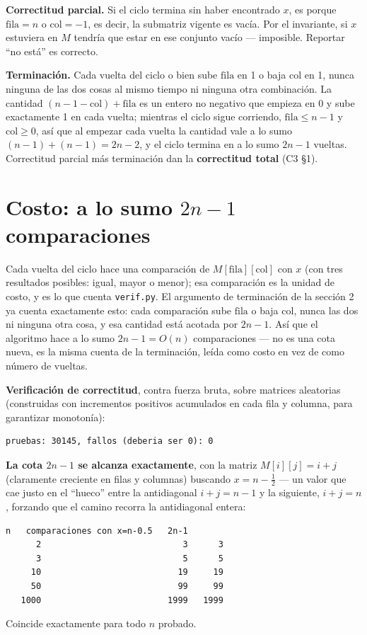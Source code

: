 \documentclass[11pt]{article}
\begin{document}
\textbf{Correctitud parcial.} Si el ciclo termina sin haber encontrado $x$, es porque
$\mathrm{fila}=n$ o $\mathrm{col}=-1$, es decir, la submatriz vigente es vacía. Por el invariante, si $x$
estuviera en $M$ tendría que estar en ese conjunto vacío --- imposible. Reportar ``no está'' es correcto.

\textbf{Terminación.} Cada vuelta del ciclo o bien sube $\mathrm{fila}$ en 1 o baja $\mathrm{col}$ en 1,
nunca ninguna de las dos cosas al mismo tiempo ni ninguna otra combinación. La cantidad
$(n-1-\mathrm{col})+\mathrm{fila}$ es un entero no negativo que empieza en 0 y sube exactamente 1 en cada
vuelta; mientras el ciclo sigue corriendo, $\mathrm{fila}\le n-1$ y $\mathrm{col}\ge 0$, así que al empezar
cada vuelta la cantidad vale a lo sumo $(n-1)+(n-1)=2n-2$, y el ciclo termina en a lo sumo $2n-1$ vueltas. Correctitud parcial más terminación dan la
\textbf{correctitud total} (C3 §1).

\section{Costo: a lo sumo \texorpdfstring{$2n-1$}{2n-1} comparaciones}

Cada vuelta del ciclo hace una comparación de $M[\mathrm{fila}][\mathrm{col}]$ con $x$ (con tres
resultados posibles: igual, mayor o menor); esa comparación es la unidad de costo, y es lo que cuenta
\texttt{verif.py}. El argumento de terminación de la sección 2 ya cuenta exactamente esto: cada comparación sube
$\mathrm{fila}$ o baja $\mathrm{col}$, nunca las dos ni ninguna otra cosa, y esa cantidad está acotada por
$2n-1$. Así que el algoritmo hace a lo sumo $2n-1=O(n)$ comparaciones --- no es una cota nueva, es la misma
cuenta de la terminación, leída como costo en vez de como número de vueltas.

\textbf{Verificación de correctitud}, contra fuerza bruta, sobre matrices aleatorias (construidas con
incrementos positivos acumulados en cada fila y columna, para garantizar monotonía):
\begin{lstlisting}[style=salida]
pruebas: 30145, fallos (deberia ser 0): 0
\end{lstlisting}

\textbf{La cota $2n-1$ se alcanza exactamente}, con la matriz $M[i][j]=i+j$ (claramente creciente en filas
y columnas) buscando $x=n-\tfrac12$ --- un valor que cae justo en el ``hueco'' entre la antidiagonal
$i+j=n{-}1$ y la siguiente, $i+j=n$, forzando que el camino recorra la antidiagonal entera:
\begin{lstlisting}[style=salida]
      n   comparaciones con x=n-0.5   2n-1
      2                            3      3
      3                            5      5
     10                           19     19
     50                           99     99
   1000                         1999   1999
\end{lstlisting}
Coincide exactamente para todo $n$ probado.
\end{document}
